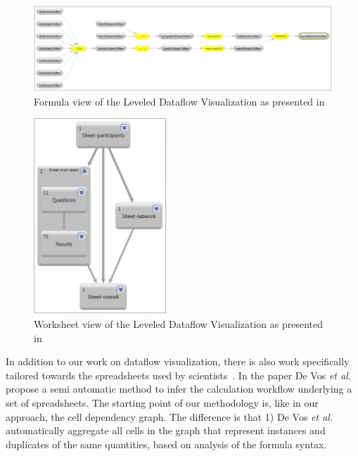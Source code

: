 \documentclass[conference]{IEEEtran}
\begin{document}
\begin{figure}
  \begin{center}
  \includegraphics[width=\columnwidth]{fig/formula-view.png}
  \caption{Formula view of the Leveled Dataflow Visualization as presented in \cite{hermans_supporting_2011}}
  \label{fig:formula-view}
  \end{center}
\end{figure} 

\begin{figure}
  \begin{center}
  \includegraphics[width=5cm]{fig/worksheet-view.png}
  \caption{Worksheet view of the Leveled Dataflow Visualization as presented in \cite{hermans_supporting_2011}}
  \label{fig:worksheet-view}
  \end{center}
\end{figure} 

In addition to our work on dataflow visualization, there is also work specifically tailored towards the spreadsheets used by scientists~\cite{de_vos_methodology_2015}. In the paper De Vos \emph{et al.} propose a semi automatic method to infer the calculation workflow underlying a set of spreadsheets. The starting point of our methodology is, like in our approach, the cell dependency graph. The difference is that 1) De Vos \emph{et al.} automatically aggregate all cells in the graph that represent instances and duplicates of the same quantities, based on analysis of the formula syntax.
\end{document}
